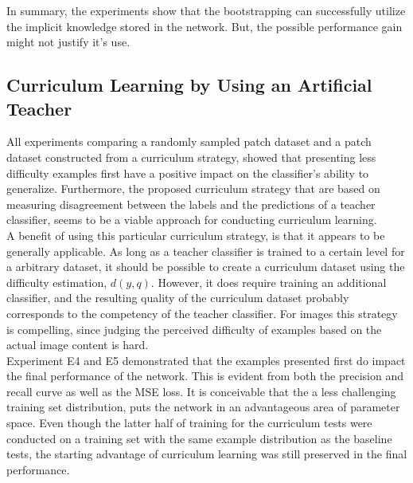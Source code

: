 In summary, the experiments show that the bootstrapping can successfully utilize the implicit knowledge stored in the network. But, the possible performance gain might not justify it's use. \\


\subsection{Curriculum Learning by Using an Artificial Teacher}
All experiments comparing a randomly sampled patch dataset and a patch dataset constructed from a curriculum strategy, showed that presenting less difficulty examples first have a positive impact on the classifier's ability to generalize.  Furthermore, the proposed curriculum strategy that are based on measuring disagreement between the labels and the predictions of a teacher classifier, seems to be a viable approach for conducting curriculum learning. \\

A benefit of using this particular curriculum strategy, is that it appears to be generally applicable. As long as a teacher classifier is trained to a certain level for a arbitrary dataset, it should be possible to create a curriculum dataset using the difficulty estimation, $d(y,q)$. However, it does require training an additional classifier, and the resulting quality of the curriculum dataset probably corresponds to the competency of the teacher classifier. For images this strategy is compelling, since judging the perceived difficulty of examples based on the actual image content is hard.\\

Experiment E4 and E5 demonstrated that the examples presented first do impact the final performance of the network. This is evident from both the precision and recall curve as well as the MSE loss. It is conceivable that the a less challenging training set distribution, puts the network in an advantageous area of parameter space. Even though the latter half of training for the curriculum tests were conducted on a training set with the same example distribution as the baseline tests, the starting advantage of curriculum learning was still preserved in the final performance.  \\


